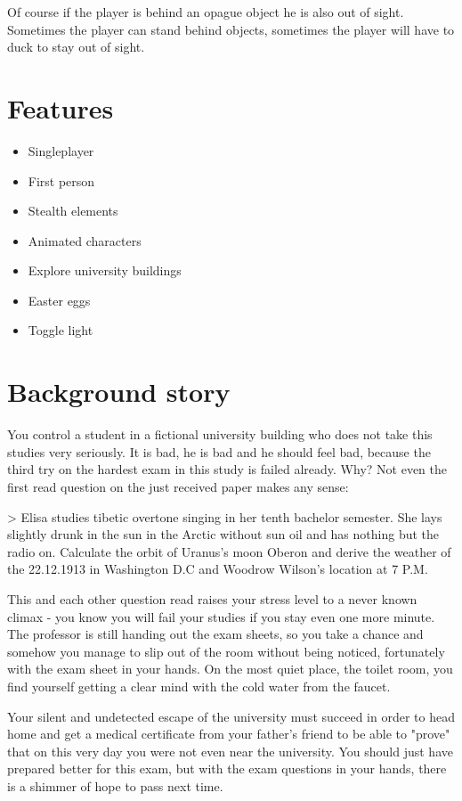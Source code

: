 \documentclass[12pt]{article}
\begin{document}
Of course if the player is behind an opague object he is also out of sight. Sometimes the player can stand behind objects, sometimes the player will have to duck to stay out of sight.

\section*{Features} 
\begin{itemize}
	\item Singleplayer
	\item First person
	\item Stealth elements
	\item Animated characters
	\item Explore university buildings
	\item Easter eggs
	\item Toggle light
\end{itemize}

\section*{Background story}
You control a student in a fictional university building who does not take this studies very seriously. It is bad, he is bad and he should feel bad, because the third try on the hardest exam in this study is failed already. Why? Not even the first read question on the just received paper makes any sense: 

> Elisa studies tibetic overtone singing in her tenth bachelor semester. She lays slightly drunk in the sun in the Arctic without sun oil and has nothing but the radio on. Calculate the orbit of Uranus's moon Oberon and derive the weather of the 22.12.1913 in Washington D.C and Woodrow Wilson's location at 7 P.M.

This and each other question read raises your stress level to a never known climax - you know you will fail your studies if you stay even one more minute. The professor is still handing out the exam sheets, so you take a chance and somehow you manage to slip out of the room without being noticed, fortunately with the exam sheet in your hands. On the most quiet place, the toilet room, you find yourself getting a clear mind with the cold water from the faucet.

Your silent and undetected escape of the university must succeed in order to head home and get a medical certificate from your father's friend to be able to "prove" that on this very day you were not even near the university. You should just have prepared better for this exam, but with the exam questions in your hands, there is a shimmer of hope to pass next time.
\end{document}
